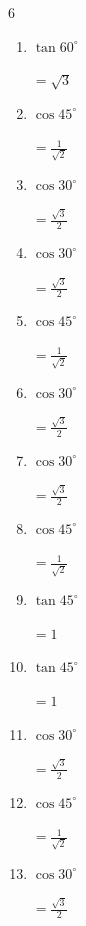 \begin{multicols}{6}
\begin{enumerate}
  \item $\displaystyle \tan{60^\circ}$

        $\displaystyle =\sqrt{3}$

  \item $\displaystyle \cos{45^\circ}$

        $\displaystyle =\frac{1}{\sqrt{2}}$

  \item $\displaystyle \cos{30^\circ}$

        $\displaystyle =\frac{\sqrt{3}}{2}$

  \item $\displaystyle \cos{30^\circ}$

        $\displaystyle =\frac{\sqrt{3}}{2}$

  \item $\displaystyle \cos{45^\circ}$

        $\displaystyle =\frac{1}{\sqrt{2}}$

  \item $\displaystyle \cos{30^\circ}$

        $\displaystyle =\frac{\sqrt{3}}{2}$

  \item $\displaystyle \cos{30^\circ}$

        $\displaystyle =\frac{\sqrt{3}}{2}$

  \item $\displaystyle \cos{45^\circ}$

        $\displaystyle =\frac{1}{\sqrt{2}}$

  \item $\displaystyle \tan{45^\circ}$

        $\displaystyle =1$

  \item $\displaystyle \tan{45^\circ}$

        $\displaystyle =1$

  \item $\displaystyle \cos{30^\circ}$

        $\displaystyle =\frac{\sqrt{3}}{2}$

  \item $\displaystyle \cos{45^\circ}$

        $\displaystyle =\frac{1}{\sqrt{2}}$

  \item $\displaystyle \cos{30^\circ}$

        $\displaystyle =\frac{\sqrt{3}}{2}$


\end{enumerate}
\end{multicols}
